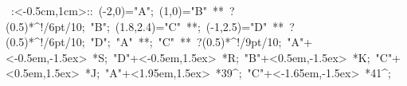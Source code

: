 
\hbox{
\xy    <1cm,0cm>:<-0.5cm,1cm>::
       (-2,0)="A";  (1,0)="B" **\dir{-} ?(0.5)*^!/6pt/{10};
       "B"; (1.8,2.4)="C" **\dir{-};  (-1,2.5)="D" **\dir{-} ?(0.5)*^!/6pt/{10};
       "D"; "A" **\dir{-}; "C" **\dir{-}  ?(0.5)*^!/9pt/{10}; 
       "A"+<-0.5em,-1.5ex> *{S};
       "D"+<-0.5em,1.5ex> *{R};
       "B"+<0.5em,-1.5ex> *{K};
       "C"+<0.5em,1.5ex> *{J};
       "A"+<1.95em,1.5ex> *{39^\circ};
       "C"+<-1.65em,-1.5ex> *{41^\circ};
       \endxy}
	   

